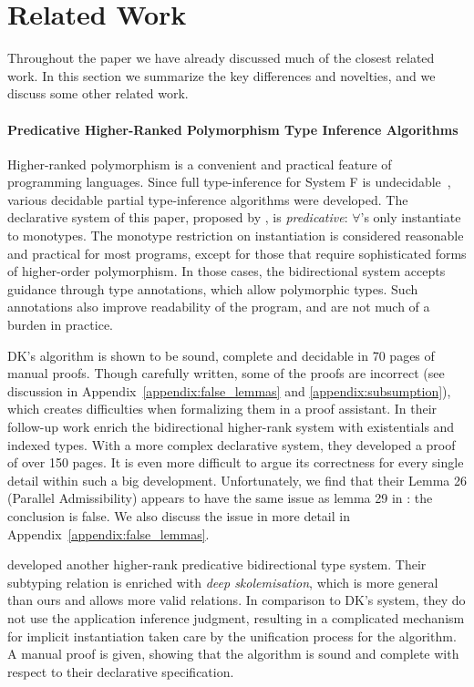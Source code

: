 \section{Related Work}

Throughout the paper we have already discussed much of the closest related work.
In this section we summarize the key differences and novelties, and we discuss some other
related work.

\paragraph{Predicative Higher-Ranked Polymorphism Type Inference Algorithms}
Higher-ranked polymorphism is a convenient and practical feature of
programming languages.  Since full type-inference for System F is
undecidable~\cite{wells1999typability}, various decidable partial
type-inference algorithms were developed.
The declarative system of this paper,
proposed by \citet{dunfield2013complete}, is \emph{predicative}: 
$\forall$'s only instantiate to monotypes.  The monotype restriction
on instantiation is considered reasonable and practical for most
programs, except for those that require sophisticated forms of
higher-order polymorphism.  In those cases, the bidirectional system
accepts guidance through type annotations, which allow polymorphic types.
Such annotations also improve
readability of the program, and are not much of a burden in practice.

DK's algorithm is shown to be sound, complete and decidable in 70 pages of manual proofs.
Though carefully written, some of the proofs are incorrect
(see discussion in Appendix~\ref{appendix:false_lemmas} and \ref{appendix:subsumption}),
which creates difficulties when formalizing them in a proof assistant.
In their follow-up work \citet{DunfieldIndexed} enrich the bidirectional higher-rank system with
existentials and indexed types.
With a more complex declarative system, they developed a proof of over 150 pages.
It is even more difficult to argue its correctness for every single detail within such a big development.
Unfortunately, we find that their Lemma 26 (Parallel Admissibility) appears to have the same issue 
as lemma 29 in \citet{dunfield2013complete}: the conclusion is false. We also discuss
the issue in more detail in Appendix~\ref{appendix:false_lemmas}.

\citet{jones2007practical} developed another higher-rank predicative bidirectional type system.
Their subtyping relation is enriched with \emph{deep skolemisation},
which is more general than ours and allows more valid relations.
In comparison to DK's system, they do not use the application inference judgment,
resulting in a complicated mechanism for implicit instantiation taken care by the unification process for the algorithm.
A manual proof is given, showing that the algorithm is sound and
complete with respect to their declarative specification.

